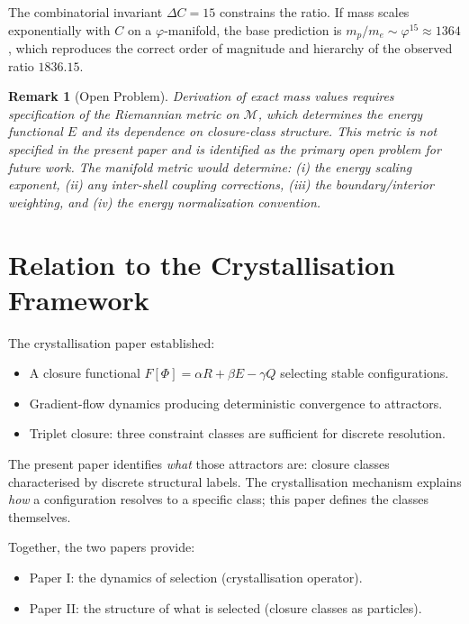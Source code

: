 \documentclass[12pt]{article}
\newtheorem{remark}[theorem]{Remark}
\newcommand{\Mcal}{\mathcal{M}}
\newcommand{\phig}{\varphi}
\begin{document}
The combinatorial invariant $\Delta C = 15$ constrains the ratio. If mass scales exponentially with $C$ on a $\phig$-manifold, the base prediction is $m_p/m_e \sim \phig^{15} \approx 1364$, which reproduces the correct order of magnitude and hierarchy of the observed ratio $1836.15$.

\begin{remark}[Open Problem]
Derivation of exact mass values requires specification of the Riemannian metric on $\Mcal$, which determines the energy functional $E$ and its dependence on closure-class structure. This metric is not specified in the present paper and is identified as the primary open problem for future work. The manifold metric would determine: (i) the energy scaling exponent, (ii) any inter-shell coupling corrections, (iii) the boundary/interior weighting, and (iv) the energy normalization convention.
\end{remark}

\section{Relation to the Crystallisation Framework}\label{sec:relation}

The crystallisation paper \citep{Smart2026} established:
\begin{itemize}
    \item A closure functional $F[\Phi] = \alpha R + \beta E - \gamma Q$ selecting stable configurations.
    \item Gradient-flow dynamics producing deterministic convergence to attractors.
    \item Triplet closure: three constraint classes are sufficient for discrete resolution.
\end{itemize}

The present paper identifies \textit{what} those attractors are: closure classes characterised by discrete structural labels. The crystallisation mechanism explains \textit{how} a configuration resolves to a specific class; this paper defines the classes themselves.

Together, the two papers provide:
\begin{itemize}
    \item Paper I: the dynamics of selection (crystallisation operator).
    \item Paper II: the structure of what is selected (closure classes as particles).
\end{itemize}
\end{document}
